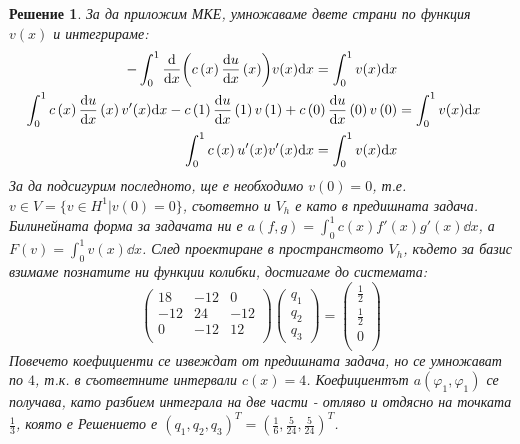 \documentclass[12pt]{article}
\newtheorem*{solution*}{Решение}
\begin{document}
\begin{large}
  \begin{solution*}
    За да приложим МКЕ, умножаваме двете страни по функция $v(x)$ и интегрираме:
    \begin{align*}
      -\int_{0}^{1}\dv{x}(c\left(x\right)\dv{u}{x}\left(x\right))v(x)\dd x = \int_{0}^{1}v(x)\dd x \\
      \int_{0}^{1}c\left(x\right)\dv{u}{x}\left(x\right)v'(x)\dd x - c\left(1\right)\dv{u}{x}\left(1\right)v\left(1\right) + c\left(0\right)\dv{u}{x}\left(0\right)v\left(0\right) &= \int_{0}^{1}v(x)\dd x \\
      \int_{0}^{1}c\left(x\right)u'(x)v'(x)\dd x = \int_{0}^{1}v(x)\dd x \\
    \end{align*}
    За да подсигурим последното, ще е необходимо $v\left(0\right)=0$, т.е. $v \in V = \{v \in H^1 \vert v\left(0\right)=0\}$, съответно и $V_h$ е като в предишната задача. Билинейната форма за задачата ни е $a\left(f, g\right)=\int_{0}^{1}c(x)f'(x)g'(x)\dd x$, а $F\left(v\right)=\int_{0}^{1}v(x)\dd x$. След проектиране в пространството $V_h$, където за базис взимаме познатите ни функции колибки,  достигаме до системата:
    \begin{equation}
      \begin{pmatrix}
        18 & -12 & 0 \\
        -12 & 24 & -12 \\
        0 & -12 & 12 \\
      \end{pmatrix}
      \begin{pmatrix}
        q_1 \\
        q_2 \\
        q_3
      \end{pmatrix}
      =
      \begin{pmatrix}
        \frac{1}{2} \\
        \frac{1}{2} \\
        0 \\
      \end{pmatrix}
    \end{equation}
    Повечето коефициенти се извеждат от предишната задача, но се умножават по $4$, т.к. в съответните интервали $c(x)=4$. Коефициентът $a\left(\varphi_1, \varphi_1\right)$ се получава, като разбием интеграла на две части - отляво и отдясно на точката $\frac{1}{3}$, която е
    Решението е $(q_1, q_2, q_3)^T = (\frac{1}{6}, \frac{5}{24}, \frac{5}{24})^T$.
  \end{solution*}
\end{large}
\end{document}
